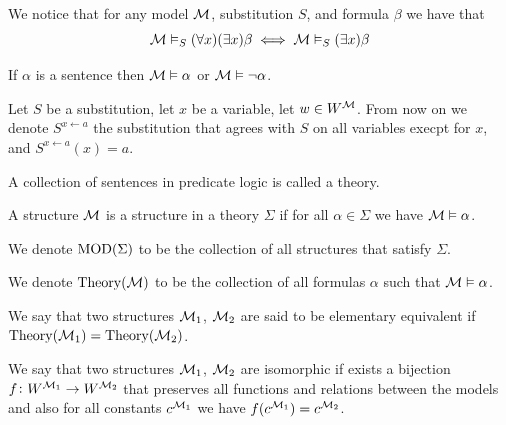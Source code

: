 \documentclass[11pt,a4paper]{article}
\DeclareRobustCommand{\models}{%
  \mathrel{\vDash}%
}
\begin{document}
\begin{remark}
  We notice that for any model $\mathcal{M}$, substitution $S$, and formula $\beta$
  we have that
  \[
    \M \models_S (\forall x)(\exists x) \beta \iff
    \M \models_S (\exists x) \beta
  \]
\end{remark}

\begin{corollary}
  If $\alpha$ is a sentence then $\M \models \alpha$ or 
  $\M \models \neg \alpha$.
\end{corollary}

\begin{remark}
  Let $S$ be a substitution, let $x$ be a variable, let $w \in W^{\mathcal{M}}$.
  From now on we denote $S^{x \gets a}$ the substitution that agrees
  with $S$ on all variables execpt for $x$, and $S^{x \gets a}(x) = a$.
\end{remark}


\begin{definition}[Theory]
  A collection of sentences in predicate logic is called a theory.
\end{definition}

\begin{definition}
  A structure $\mathcal{M}$ is a structure in a theory $\Sigma$ if for all
  $\alpha \in \Sigma$ we have $\M \models \alpha$.
\end{definition}

\begin{remark}
  We denote $\operatorname{MOD}(\Sigma)$ to be the collection of all structures that
  satisfy $\Sigma$.
\end{remark}

\begin{remark}
  We denote $\operatorname{Theory}(\mathcal{M})$ to be the collection of all formulas $\alpha$
  such that $\M \models \alpha$.
\end{remark}

\begin{definition}
  We say that two structures $\mathcal{M}_1$, $\mathcal{M}_2$ are said to be elementary 
  equivalent if $\operatorname{Theory}(\mathcal{M}_1) = \operatorname{Theory}(\mathcal{M}_2)$.
\end{definition}

\begin{definition}
  We say that two structures $\mathcal{M}_1$, $\mathcal{M}_2$ are isomorphic
  if exists a bijection $f \colon W^{\mathcal{M}_1} \to W^{\mathcal{M}_2}$ that preserves
  all functions and relations between the models and also
  for all constants $c^{\mathcal{M}_1}$ we have $f(c^{\mathcal{M}_1}) = c^{\mathcal{M}_2}$.
\end{definition}
\end{document}
